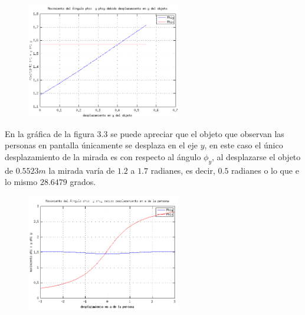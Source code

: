     \begin{figure}[htbp]
    	\centering
    	\includegraphics[width=0.6\textwidth]{./pictures/figure2}
    	\caption{}\label{fig: figura}
    \end{figure}
    En la gráfica de la figura 3.3	se puede apreciar que el objeto que observan las personas en pantalla únicamente se desplaza en el eje $y$, en este caso el único desplazamiento de la mirada es con respecto al ángulo  $\phi_y$, al desplazarse el objeto de $0.5523m$ la mirada varía de $1.2$ a $1.7$ radianes, es decir, $0.5$ radianes o lo que e lo mismo $28.6479$ grados.
     \begin{figure}[htbp]
     	\centering
     	\includegraphics[width=0.6\textwidth]{./pictures/figure3}
     	\caption{}\label{fig: figura}
     \end{figure}
     
